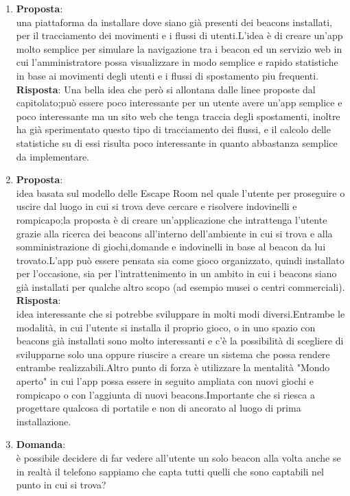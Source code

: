 \documentclass[a4paper,titlepage]{article}
\begin{document}
\begin{enumerate}
  \item \textbf{Proposta}: \\
  una piattaforma da installare dove siano già presenti dei beacons installati, per il tracciamento dei movimenti e i flussi di utenti.L'idea è di creare un'app molto semplice per simulare la navigazione tra i beacon ed un servizio web in cui l'amministratore possa visualizzare in modo semplice e rapido statistiche in base ai movimenti degli utenti e i flussi di spostamento piu frequenti. \\
  \textbf{Risposta}:
  Una bella idea che però si allontana dalle linee proposte dal capitolato;può essere poco interessante per un utente avere un'app semplice e poco interessante ma un sito web che tenga traccia degli spostamenti, inoltre \PROPONENTE{} ha già sperimentato questo tipo di tracciamento dei flussi, e il calcolo delle statistiche su di essi risulta poco interessante in quanto abbastanza semplice da implementare.
  \item \textbf{Proposta}: \\
  idea basata sul modello delle Escape Room nel quale l'utente per proseguire o uscire dal luogo in cui si trova deve cercare e risolvere indovinelli e rompicapo;la proposta è di creare un'applicazione che intrattenga l'utente grazie alla ricerca dei beacons all'interno dell'ambiente in cui si trova e alla somministrazione di giochi,domande e indovinelli in base al beacon da lui trovato.L'app può essere pensata sia come gioco organizzato, quindi installato per l'occasione, sia per l'intrattenimento in un ambito in cui i beacons siano già installati per qualche altro scopo (ad esempio musei o centri commerciali).\\
  \textbf{Risposta}: \\
  idea interessante che si potrebbe sviluppare in molti modi diversi.Entrambe le modalità, in cui l'utente si installa il proprio gioco, o in uno spazio con beacons già installati sono molto interessanti e c'è la possibilità di scegliere di svilupparne solo una oppure riuscire a creare un sistema che possa rendere entrambe realizzabili.Altro punto di forza è utilizzare la mentalità "Mondo aperto" in cui l'app possa essere in seguito ampliata con nuovi giochi e rompicapo o con l'aggiunta di nuovi beacons.Importante che si riesca a progettare qualcosa di portatile e non di ancorato al luogo di prima installazione.
  \item \textbf{Domanda}:\\
  è possibile decidere di far vedere all'utente un solo beacon alla volta anche se in realtà il telefono sappiamo che capta tutti quelli che sono captabili nel punto in cui si trova?\\

\end{enumerate}
\end{document}
